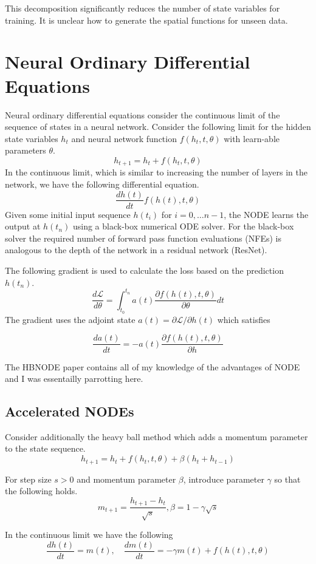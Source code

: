 \documentclass[]{type}
\begin{document}
This decomposition significantly reduces the number of state variables for training.
It is unclear how to generate the spatial functions for unseen data.


\section{Neural Ordinary Differential Equations}

Neural ordinary differential equations consider the continuous limit of the sequence of states in a neural network.
Consider the following limit for the hidden state variables $h_t$ and neural network function $f(h_t,t,\theta)$
with learn-able parameters $\theta$.
$$h_{t+1}=h_t+f(h_t,t,\theta)$$
In the continuous limit, which is similar to increasing the number of layers in the network, 
we have the following differential equation.
$$\frac{dh(t)}{dt}f(h(t),t,\theta)$$
Given some initial input sequence $h(t_i)$ for $i=0,\dots n-1$, the NODE learns the output at $h(t_n)$
using a black-box numerical ODE solver.
For the black-box solver the required number of forward pass function evaluations (NFEs) 
is analogous to the depth of the network in a residual network (ResNet). 

The following gradient is used to calculate the loss based on the prediction $h(t_n)$.
$$\frac{d\mathcal{L}}{d\theta} = \int_{t_0}^{t_n} a(t)\frac{\partial f(h(t),t,\theta)}{\partial\theta}dt$$
\noindent
The gradient uses the adjoint state $a(t) = \partial \mathcal{L}/\partial h(t)$ which satisfies

$$\frac{da(t)}{dt}=-a(t)\frac{\partial f(h(t),t,\theta)}{\partial h}$$

The HBNODE paper contains all of my knowledge of the advantages of NODE and I was essentailly parrotting here.

\subsection{Accelerated NODEs}

Consider additionally the heavy ball method which adds a momentum parameter to the state sequence.
$$h_{t+1} = h_t+f(h_t,t,\theta)+\beta(h_t+h_{t-1})$$

For step size $s>0$ and momentum parameter $\beta$, introduce parameter $\gamma$ so that the following holds.
$$m_{t+1} = \frac{h_{t+1}-h_t}{\sqrt{s}}, \beta = 1-\gamma\sqrt{s}$$

In the continuous limit we have the following
$$\frac{dh(t)}{dt}=m(t),\quad \frac{dm(t)}{dt}=-\gamma m(t) + f(h(t),t,\theta)$$
\end{document}
